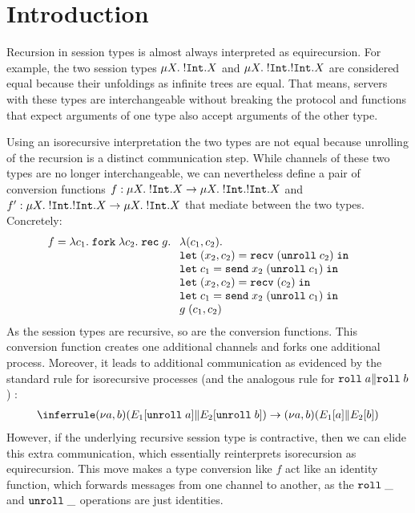 
\section{Introduction}
\label{sec:introduction}

Recursion in session types is almost always interpreted as
equirecursion. For example, the two session types $\mu X.\;{{}!\mathtt{Int}.X} $
and $\mu X.\;{{}!\mathtt{Int}.{}!\mathtt{Int}.X} $ are considered equal because
their unfoldings as infinite trees are equal. That means, servers with
these types are interchangeable without breaking the protocol and
functions that expect arguments of one type also accept arguments of
the other type.

Using an isorecursive interpretation the two types are not equal
because unrolling of the recursion is a distinct communication
step. While channels of these two types are no longer
interchangeable, we can nevertheless define a pair of conversion
functions
$f : \mu X.\;{{}!\mathtt{Int}.X} \rightarrow \mu X.\;{{}!\mathtt{Int}.{}!\mathtt{Int}.X}$
and
$f' : \mu X.\;{{}!\mathtt{Int}.{}!\mathtt{Int}.X} \rightarrow \mu X.\;{{}!\mathtt{Int}.X}$
that mediate between the two types. Concretely:
\begin{align*}
  f &=       \ELam {c_1} \EFork{ \ELam {c_2} \ERec g %
      \begin{array}[t]{l}
      \ELam{(c_1, c_2)} \\
      \ELet{(x_2,c_2)}{\ERecv{(\EUnroll{c_2})}} \\
      \ELet{c_1}{\ESend{x_2}{(\EUnroll{c_1})}} \\
      \ELet{(x_2,c_2)}{\ERecv{({c_2})}} \\
      \ELet{c_1}{\ESend{x_2}{(\EUnroll{c_1})}} \\
        g \; ({c_1}, {c_2}) %
      \end{array}}
\end{align*}
As the session types are recursive, so are the conversion
functions. This conversion function creates one additional
channels and forks one additional process. Moreover, it leads to
additional communication as evidenced by the standard rule for
isorecursive processes (and the analogous rule for $\mathtt{roll}\; a \| \mathtt{roll}\; b$) :
\begin{gather*}
  \reducerule{
    \PScope (\PPar* {\EUnroll a} {\EUnroll b})
  }{
    \PScope (\PPar* a b)
  }
\end{gather*}
However, if the underlying recursive session type is contractive, then we can
elide this extra communication, which essentially reinterprets
isorecursion as equirecursion.
This move makes a type conversion like $f$ act like an identity
function, which forwards messages from one channel to another, as the
$\mathtt{roll}\; \_$ and $\mathtt{unroll}\; \_$ operations are just identities.



